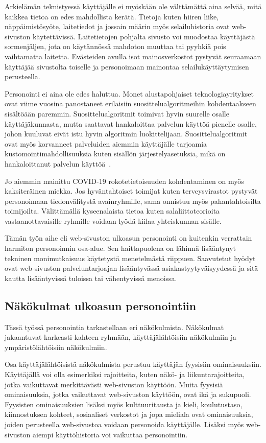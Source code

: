 \documentclass[finnish, 12pt, a4paper, elec, utf8, a-1b, online]{aaltothesis}
\begin{document}
Arkielämän teknistyessä käyttäjälle ei myöskään ole välttämättä aina selvää,
mitä kaikkea tietoa on edes mahdollista kerätä. Tietoja kuten hiiren liike,
näppäimistösyöte, laitetiedot ja jossain määrin myös selailuhistoria ovat
web-sivuston käytettävissä. Laitetietojen pohjalta sivusto voi muodostaa
käyttäjästä sormenjäljen, jota on käytännössä mahdoton muuttaa tai pyyhkiä pois
vaihtamatta laitetta. Evästeiden avulla isot mainosverkostot pystyvät seuraamaan
käyttäjää sivustolta toiselle ja personoimaan mainontaa selailukäyttäytymisen
perusteella.

Personointi ei aina ole edes haluttua. Monet alustapohjaiset teknologiayritykset
ovat viime vuosina panostaneet erilaisiin suosittelualgoritmeihin kohdentaakseen
sisältöään paremmin. Suosittelualgoritmit toimivat hyvin suurelle osalle
käyttäjäkunnasta, mutta saattavat hankaloittaa palvelun käyttöä pienelle osalle,
johon kuuluvat eivät istu hyvin algoritmin luokittelijaan. Suosittelualgoritmit
ovat myös korvanneet palveluiden aiemmin käyttäjälle tarjoamia
kustomointimahdollisuuksia kuten sisällön järjestelyasetuksia, mikä on
hankaloittanut palvelun käyttöä~\cite{patel_2022}.

Jo aiemmin mainittu COVID-19 rokotetietoisuuden kohdentaminen on myös
kaksiteräinen miekka. Jos hyväntahtoiset toimijat kuten terveysvirastot pystyvät
personoimaan tiedonvälitystä avainryhmille, sama onnistuu myös pahantahtoisilta
toimijoilta. Välittämällä kyseenalaista tietoa kuten salaliittoteorioita
vastaanottavaisille ryhmille voidaan lyödä kiilaa yhteiskunnan sisälle.

Tämän työn aihe eli web-sivuston ulkoasun personointi on kuitenkin verrattain
harmiton personoinnin osa-alue. Sen haittapuolena on lähinnä lisääntynyt
tekninen monimutkaisuus käytetystä menetelmästä riippuen. Saavutetut hyödyt ovat
web-sivuston palveluntarjoajan lisääntyvässä asiakastyytyväisyydessä ja sitä
kautta lisääntyvissä tuloissa tai vähentyvissä menoissa.

\subsection{Näkökulmat ulkoasun personointiin}\label{personalization-aspects}

Tässä työssä personointia tarkastellaan eri näkökulmista. Näkökulmat jakaantuvat
karkeasti kahteen ryhmään, käyttäjälähtöisiin näkökulmiin ja ympäristölähtöisiin
näkökulmiin.

Osa käyttäjälähtöisistä näkökulmista perustuu käyttäjän fyysisiin
ominaisuuksiin. Käyttäjällä voi olla esimerkiksi rajoitteita, kuten näkö- ja
liikuntarajoitteita, jotka vaikuttavat merkittävästi web-sivuston käyttöön.
Muita fyysisiä ominaisuuksia, jotka vaikuttavat web-sivuston käyttöön, ovat ikä
ja sukupuoli. Fyysisten ominaisuuksien lisäksi myös kulttuuritausta ja kieli,
koulutustaso, kiinnostuksen kohteet, sosiaaliset verkostot ja jopa mieliala ovat
ominaisuuksia, joiden perusteella web-sivustoa voidaan personoida käyttäjälle.
Lisäksi myös web-sivuston aiempi käyttöhistoria voi vaikuttaa personointiin.
\end{document}
